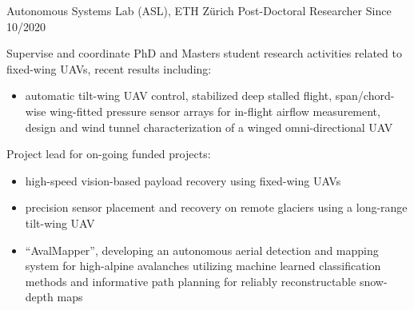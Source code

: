 \label{sec:exp}

\vspace{-8pt}
\begin{cventries}
%
\cvexpentry
  	{Autonomous Systems Lab (ASL), ETH Z\"{u}rich} %
  	{Post-Doctoral Researcher} %
    {} %
    {Since 10/2020} %
    {
      \begin{cvitems} %
      	\item Supervise and coordinate PhD and Masters student research activities related to fixed-wing UAVs, recent results including:
		\begin{itemize}
			\item automatic tilt-wing UAV control, stabilized deep stalled flight, span/chord-wise wing-fitted pressure sensor arrays for in-flight airflow measurement, design and wind tunnel characterization of a winged omni-directional UAV
		\end{itemize}
      	\item Project lead for on-going funded projects:
      	\begin{itemize}
      		\item high-speed vision-based payload recovery using fixed-wing UAVs
      		\item precision sensor placement and recovery on remote glaciers using a long-range tilt-wing UAV
      		\item ``AvalMapper'', developing an autonomous aerial detection and mapping system for high-alpine avalanches utilizing machine learned classification methods and informative path planning for reliably reconstructable snow-depth maps
		\end{itemize}      	 

\end{cvitems}}
\end{cventries}
